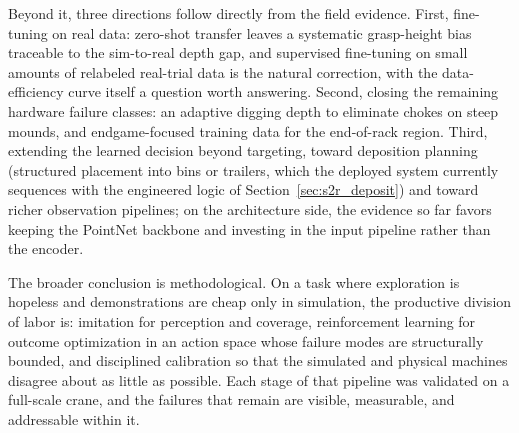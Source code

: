 Beyond it, three directions follow directly from the field evidence. First,
fine-tuning on real data: zero-shot transfer leaves a systematic grasp-height
bias traceable to the sim-to-real depth gap, and supervised fine-tuning on
small amounts of relabeled real-trial data is the natural correction, with
the data-efficiency curve itself a question worth answering. Second, closing
the remaining hardware failure classes: an adaptive digging depth to
eliminate chokes on steep mounds, and endgame-focused training data for the
end-of-rack region. Third, extending the learned decision beyond targeting,
toward deposition planning (structured placement into bins or trailers,
which the deployed system currently sequences with the engineered logic of
Section~\ref{sec:s2r_deposit}) and
toward richer observation pipelines; on the architecture side, the evidence
so far favors keeping the PointNet backbone and investing in the input
pipeline rather than the encoder.

The broader conclusion is methodological. On a task where exploration is
hopeless and demonstrations are cheap only in simulation, the productive
division of labor is: imitation for perception and coverage, reinforcement
learning for outcome optimization in an action space whose failure modes are
structurally bounded, and disciplined calibration so that the simulated and
physical machines disagree about as little as possible. Each stage of that
pipeline was validated on a full-scale crane, and the failures that remain
are visible, measurable, and addressable within it.
